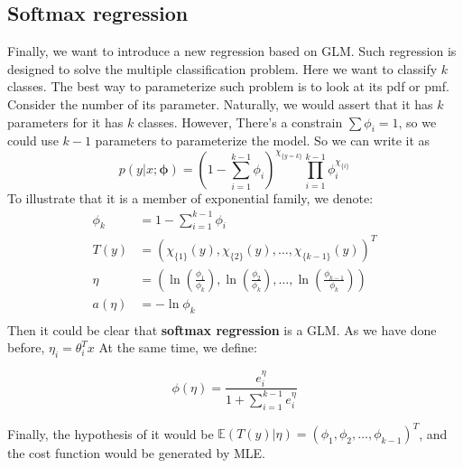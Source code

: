 \subsection{Softmax regression}
Finally, we want to introduce a new regression based on GLM. Such regression is designed to solve the multiple classification problem. Here we want to classify $k$ classes. 
The best way to parameterize such problem is to look at its pdf or pmf. Consider the number of its parameter. Naturally, we would assert that it has $k$ parameters for it has $k$ classes. However,
There's a constrain $\sum \phi_i = 1$, so we could use $k-1$ parameters to parameterize the model.
So we can write it as
\[p(y|x;\mathbf{\phi}) = \left(1-\sum_{i=1}^{k-1}\phi_i\right)^{\chi_{\{y=k\}}}\prod_{i=1}^{k-1} \phi_i^{\chi_{\{i\}}}\]
To illustrate that it is a member of exponential family, we denote:
\begin{align*}
    \phi_k &= 1 - \sum_{i=1}^{k-1} \phi_i \\
    T(y) &= \left(\chi_{\{1\}}(y), \chi_{\{2\}}(y), \ldots, \chi_{\{k-1\}}(y)\right)^T\\
    \eta &= \left(\ln\left(\frac{\phi_1}{\phi_k}\right), \ln\left(\frac{\phi_2}{\phi_k}\right), \ldots, \ln\left(\frac{\phi_{k-1}}{\phi_k}\right)\right)\\
    a(\eta) &= -\ln\phi_k\\
\end{align*}
Then it could be clear that \textbf{softmax regression} is a GLM. As we have done before, $\eta_i = \theta_i^Tx$ At the same time, we define:
\begin{define}
    \[\phi(\eta) = \frac{e^\eta_i}{1+\sum_{i=1}^{k-1}e^\eta_i}\]
\end{define}
Finally, the hypothesis of it would be $\mathbb{E}(T(y)|\eta) = (\phi_1,\phi_2,\ldots,\phi_{k-1})^T$, and the cost function would be generated by MLE.

